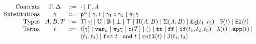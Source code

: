 
\renewcommand{\Rule}[3][]{
    \pgfkeys{/Rule, default, #1}%
    \ifthenelse{\equal{\inferrulevskip}{default}}{%
        \mprset{vskip=}%
    }{%
        \mprset{vskip=\inferrulevskip}
    }%
    \ifthenelse{\equal{\inferrulesep}{default}}{%
        \mprset{sep=3ex}%
    }{%
        \mprset{sep=\inferrulesep}
    }%
        \ensuremath{\inferrule{#2}{#3}}%
}

\newcommand{\RuleWithName}[3][]{
    \pgfkeys{/Rule, default, #1}%
    \ifthenelse{\equal{\inferrulevskip}{default}}{%
        \mprset{vskip=}%
    }{%
        \mprset{vskip=\inferrulevskip}
    }%
    \ifthenelse{\equal{\inferrulesep}{default}}{%
        \mprset{sep=3ex}%
    }{%
        \mprset{sep=\inferrulesep}
    }%
    \ifthenelse{\equal{\inferrulename}{0}}{%
        \ensuremath{\inferrule{#2}{#3}}%
    }{%
        \ifthenelse{\equal{\inferrulelabel}{0}}{\ensuremath{%
            \inferrule*[lab={\rulelbl{\inferrulename}}]{#2}{#3}
        }}{\ensuremath{%
            \inferrule*[lab={\rulelbl[\inferrulelabel]{\inferrulename}}]{#2}{#3}
        }}%
    }%
}



\begin{gather*}
  \begin{array}{@{}r@{\hspace{2ex}}c@{\ \ }c@{\ \ }l@{}}
  \text{Contexts} & \Gm, \Dl &\Coloneqq &
      \cdot \mid \Gm, A
      \\ 
  \text{Substitutions} & \gm &\Coloneqq &
      \SubstWeak{n} \mid \SubstExt{\gm}{t} \mid \SubstComp{\gm_1}{\gm_2} \mid \pi_1 \gm
      \\
  \text{Types} & A, B, T  &\Coloneqq &
      \sub{T}{\gm} \mid
      \cU \mid \cB \mid \bot \mid \top \mid \TyPi{A}{B} \mid \TySigma{A}{B} \mid \TyId{t_1}{t_2} \mid \TyS{t} \mid \El{t}
      \\
  \text{Terms} & t &\Coloneqq &
      \sub{t}{\gm} \mid \var{n} \mid \pi_2 \gm \mid \codety{T} \mid \unit \mid \true \mid \false \mid \ifb{t_1}{t_2}{t_3} \mid \lam{t} \mid \app{t} \mid
      \\ &&&
      \pair{t_1}{t_2} \mid \fst{t} \mid \snd{t} \mid \eqrefl{t} \mid  \Jeq{t_1}{t_2}
  \end{array}
\end{gather*}
  

